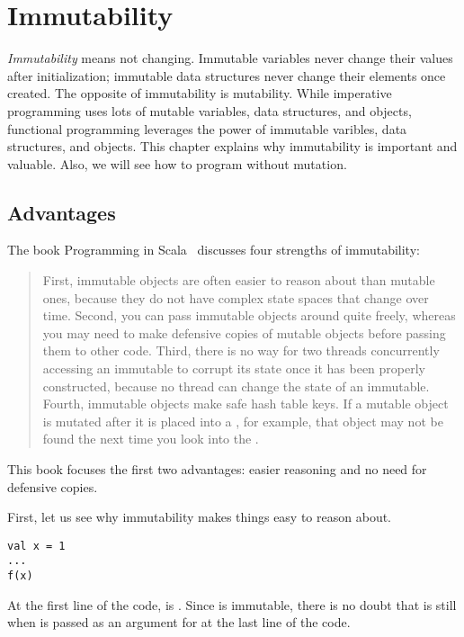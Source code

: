 \setchapterpreamble[u]{\margintoc}
\chapter{Immutability}

\textit{Immutability} means not changing.
Immutable variables never change their values
after initialization; immutable data structures never change their elements
once created. The opposite of immutability is mutability. While imperative
programming uses lots of mutable variables, data structures, and objects,
functional programming leverages the power of immutable varibles, data
structures, and objects. This chapter explains why immutability is important and
valuable. Also, we will see how to program without mutation.

\section{Advantages}

The book Programming in Scala~\cite{programming-in-scala}
discusses four strengths of immutability:

\begin{quote}
First, immutable objects are often easier to reason about than mutable ones,
because they do not have complex state spaces that change over time. Second, you
can pass immutable objects around quite freely, whereas you may need to make
defensive copies of mutable objects before passing them to other code. Third,
there is no way for two threads concurrently accessing an immutable to corrupt
its state once it has been properly constructed, because no thread can change the
state of an immutable. Fourth, immutable objects make safe hash table keys. If a
mutable object is mutated after it is placed into a , for example,
that object may not be found the next time you look into the .
\end{quote}

This book focuses the first two advantages:
easier reasoning and no need for defensive copies.

First, let us see why immutability makes things easy to reason about.

\begin{verbatim}
val x = 1
...
f(x)
\end{verbatim}

At the first line of the code,  is . Since  is immutable,
there is no doubt that  is still  when  is passed as an
argument for  at the last line of the code.

